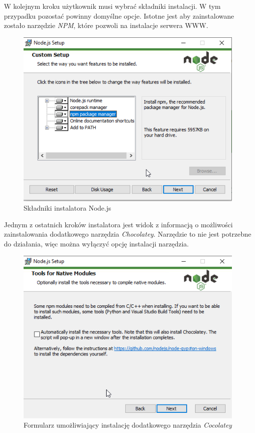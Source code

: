 \documentclass[a4paper,twoside,12pt]{book}
\begin{document}
{W kolejnym kroku użytkownik musi wybrać składniki instalacji. W tym przypadku pozostać powinny domyślne opcje. Istotne jest aby zainstalowane zostało narzędzie \textit{NPM}, które pozwoli na instalacje serwera WWW.
\begin{figure}[h!]
	\centering
	\includegraphics[width=0.6\linewidth]{../zrzuty_ekranu/instalacja_nodejs/node4}
	\caption{Składniki instalatora Node.js}
	\label{fig:node4}
\end{figure}
\FloatBarrier

Jednym z ostatnich kroków instalatora jest widok z informacją o możliwości zainstalowania dodatkowego narzędzia \textit{Chocolatey}. Narzędzie to nie jest potrzebne do działania, więc można wyłączyć opcję instalacji narzędzia.
\begin{figure}[h!]
	\centering
	\includegraphics[width=0.6\linewidth]{../zrzuty_ekranu/instalacja_nodejs/node5}
	\caption{Formularz umożliwiający instalację dodatkowego narzędzia \textit{Cocolatey}}
	\label{fig:node5}
\end{figure}
\FloatBarrier

}
\end{document}
